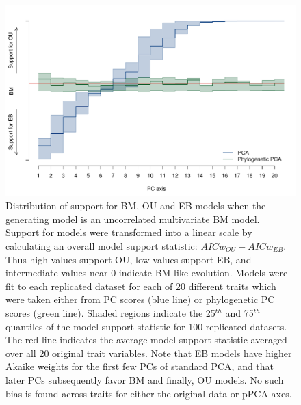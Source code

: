 \documentclass[12pt,twoside]{article}
\begin{document}
\begin{figure}[p]
\centering
\includegraphics[scale=0.65]{./fig/uncor-bm-aic.pdf}
\caption[Model support when generating model is uncorrelated BM]{Distribution of support for BM, OU and EB models when the generating model is an uncorrelated multivariate BM model. Support for models were transformed into a linear scale by calculating an overall model support statistic: $AICw_{OU} - AICw_{EB}$. Thus high values support OU, low values support EB, and intermediate values near 0 indicate BM-like evolution. Models were fit to each replicated dataset for each of 20 different traits which were taken either from PC scores (blue line) or phylogenetic PC scores (green line). Shaded regions indicate the  25$^{th}$ and 75$^{th}$ quantiles of the model support statistic for  100 replicated datasets. The red  line indicates the average model support statistic averaged over all 20 original trait variables. Note that EB models have higher Akaike weights for the first few PCs of standard PCA, and that later PCs subsequently favor BM and finally, OU models. No such bias is found across traits for either the original data or pPCA axes.}
\label{aicwbm}
\end{figure}
\end{document}
